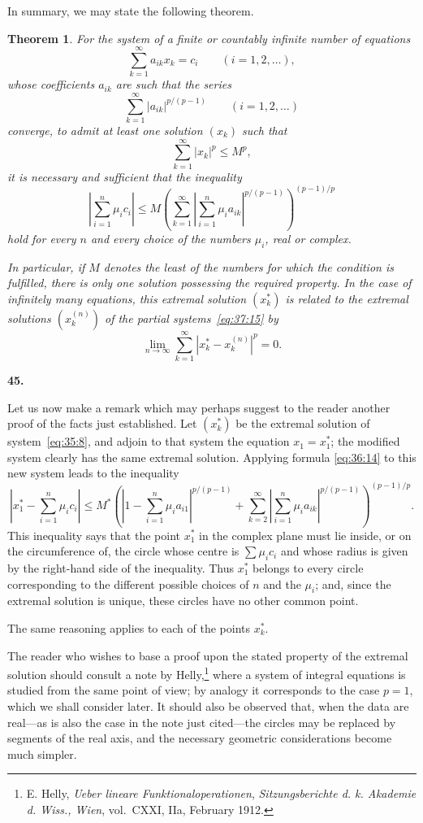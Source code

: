 \documentclass[
  paper=b5,
  fontsize=13pt,
  twoside=true,
  open=any,
  bookmarkpackage=false,
  chapterprefix=true,
  headings=normal
]{scrbook}
\newtheorem*{theorem}{Theorem}
\theoremstyle{definition}
\newcommand{\numberedparagraph}[1]{%
  \par\medskip\phantomsection\label{sec:#1}%
  \noindent\textbf{#1.}\enspace
}
\begin{document}
In summary, we may state the following theorem.

\begin{theorem}
For the system of a finite or countably infinite number of equations
\[
  \sum_{k=1}^{\infty}a_{ik}x_k=c_i\qquad(i=1,2,\ldots),
\]
whose coefficients $a_{ik}$ are such that the series
\[
  \sum_{k=1}^{\infty}|a_{ik}|^{p/(p-1)}\qquad(i=1,2,\ldots)
\]
converge, to admit at least one solution $(x_k)$ such that
\[
  \sum_{k=1}^{\infty}|x_k|^p\leq M^p,
\]
it is necessary and sufficient that the inequality
\[
  \left|\sum_{i=1}^{n}\mu_i c_i\right|
  \leq M\left(
    \sum_{k=1}^{\infty}
      \left|\sum_{i=1}^{n}\mu_i a_{ik}\right|^{p/(p-1)}
  \right)^{(p-1)/p}
\]
hold for every $n$ and every choice of the numbers $\mu_i$, real or complex.

In particular, if $M$ denotes the least of the numbers for which the
condition is fulfilled, there is only one solution possessing the required
property. In the case of infinitely many equations, this extremal solution
$(x_k^*)$ is related to the extremal solutions $(x_k^{(n)})$ of the partial
systems~\eqref{eq:37:15} by
\[
  \lim_{n\to\infty}\sum_{k=1}^{\infty}|x_k^*-x_k^{(n)}|^p=0.
\]
\end{theorem}

\numberedparagraph{45}
Let us now make a remark which may perhaps suggest to the reader another
proof of the facts just established. Let $(x_k^*)$ be the extremal solution
of system~\eqref{eq:35:8}, and adjoin to that system the equation $x_1=x_1^*$; the
modified system clearly has the same extremal solution. Applying formula
\eqref{eq:36:14} to this new system leads to the inequality
\[
 \left|x_1^*-\sum_{i=1}^{n}\mu_i c_i\right|
 \leq M^*\left(
   \left|1-\sum_{i=1}^{n}\mu_i a_{i1}\right|^{p/(p-1)}
   +\sum_{k=2}^{\infty}\left|\sum_{i=1}^{n}\mu_i a_{ik}\right|^{p/(p-1)}
 \right)^{(p-1)/p}.
\]
This inequality says that the point $x_1^*$ in the complex plane must lie
inside, or on the circumference of, the circle whose centre is
$\sum\mu_i c_i$ and whose radius is given by the right-hand side of the
inequality. Thus $x_1^*$ belongs to every circle corresponding to the
different possible choices of $n$ and the $\mu_i$; and, since the extremal
solution is unique, these circles have no other common point.

The same reasoning applies to each of the points $x_k^*$.

The reader who wishes to base a proof upon the stated property of the
extremal solution should consult a note by Helly,\footnote{E. Helly,
\emph{Ueber lineare Funktionaloperationen}, \emph{Sitzungsberichte d.
k. Akademie d. Wiss., Wien}, vol.~CXXI, IIa, February 1912.} where a system
of integral equations is studied from the same point of view; by analogy it
corresponds to the case $p=1$, which we shall consider later. It should also
be observed that, when the data are real---as is also the case in the note
just cited---the circles may be replaced by segments of the real axis, and
the necessary geometric considerations become much simpler.
\end{document}
